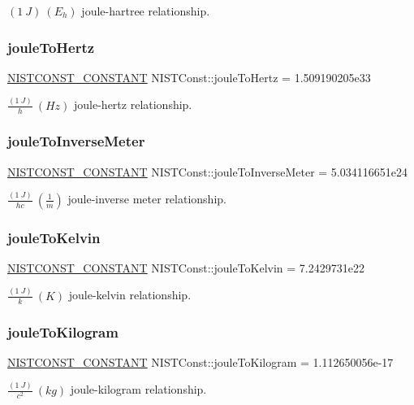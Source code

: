 $(1\ J) \ (E_h)$ joule-\/hartree relationship. \mbox{\label{group___n_i_s_t_const-_joule_ga3ad1c9580561eb98c449db137ef09d40}} 
\subsubsection{\texorpdfstring{joule\+To\+Hertz}{jouleToHertz}}
{\footnotesize\ttfamily \mbox{\hyperlink{_n_i_s_t_const_8hpp_a2b0fc1d7452373f816175dd86ce26729}{N\+I\+S\+T\+C\+O\+N\+S\+T\+\_\+\+C\+O\+N\+S\+T\+A\+NT}} N\+I\+S\+T\+Const\+::joule\+To\+Hertz = 1.\+509190205e33}

$\frac{(1\ J)}{h} \ (Hz)$ joule-\/hertz relationship. \mbox{\label{group___n_i_s_t_const-_joule_gaf31dbc48b766c4fe5d70ddb485253be8}} 
\subsubsection{\texorpdfstring{joule\+To\+Inverse\+Meter}{jouleToInverseMeter}}
{\footnotesize\ttfamily \mbox{\hyperlink{_n_i_s_t_const_8hpp_a2b0fc1d7452373f816175dd86ce26729}{N\+I\+S\+T\+C\+O\+N\+S\+T\+\_\+\+C\+O\+N\+S\+T\+A\+NT}} N\+I\+S\+T\+Const\+::joule\+To\+Inverse\+Meter = 5.\+034116651e24}

$\frac{(1\ J)}{hc} \ (\frac{1}{m})$ joule-\/inverse meter relationship. \mbox{\label{group___n_i_s_t_const-_joule_gabba35f3a458ac8488e06a1ec82b98a06}} 
\subsubsection{\texorpdfstring{joule\+To\+Kelvin}{jouleToKelvin}}
{\footnotesize\ttfamily \mbox{\hyperlink{_n_i_s_t_const_8hpp_a2b0fc1d7452373f816175dd86ce26729}{N\+I\+S\+T\+C\+O\+N\+S\+T\+\_\+\+C\+O\+N\+S\+T\+A\+NT}} N\+I\+S\+T\+Const\+::joule\+To\+Kelvin = 7.\+2429731e22}

$\frac{(1\ J)}{k} \ (K)$ joule-\/kelvin relationship. \mbox{\label{group___n_i_s_t_const-_joule_ga94f11f25f1efe95fef2594b97366c81e}} 
\subsubsection{\texorpdfstring{joule\+To\+Kilogram}{jouleToKilogram}}
{\footnotesize\ttfamily \mbox{\hyperlink{_n_i_s_t_const_8hpp_a2b0fc1d7452373f816175dd86ce26729}{N\+I\+S\+T\+C\+O\+N\+S\+T\+\_\+\+C\+O\+N\+S\+T\+A\+NT}} N\+I\+S\+T\+Const\+::joule\+To\+Kilogram = 1.\+112650056e-\/17}

$\frac{(1\ J)}{c^2} \ (kg)$ joule-\/kilogram relationship. 